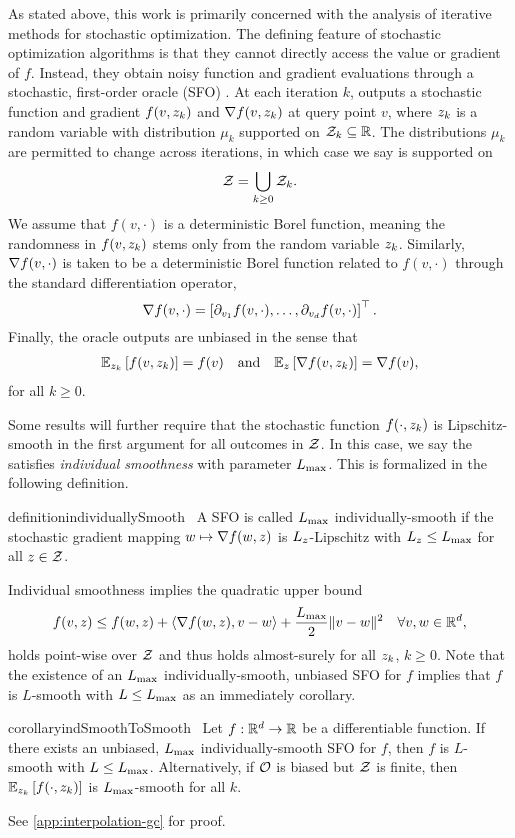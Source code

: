 As stated above, this work is primarily concerned with the analysis of iterative methods for stochastic optimization.
The defining feature of stochastic optimization algorithms is that they cannot directly access the value or gradient of \( f \).
Instead, they obtain noisy function and gradient evaluations through a stochastic, first-order oracle (SFO) \oracle. 
At each iteration \( k \), \oracle{} outputs a stochastic function and gradient \( f(v, \zk) \) and \( \grad(v, \zk) \) at query point \( v \), where \( \zk \) is a random variable with distribution \( \mu_k \) supported on \( \calZ_k \subseteq \R \). 
The distributions \( \mu_k \) are permitted to change across iterations, in which case we say \oracle{} is supported on
\[ \calZ = \bigcup_{k\geq 0} \calZ_k. \]
We assume that \( f(v, \cdot) \) is a deterministic Borel function, meaning the randomness in \( f(v, \zk) \) stems only from the random variable \( \zk \).
Similarly, \( \grad(v, \cdot) \) is taken to be a deterministic Borel function related to \( f(v, \cdot) \) through the standard differentiation operator,
\[ \grad(v, \cdot) = \sbr{\partial_{v_1} f(v, \cdot), \ldots, \partial_{v_d} f(v, \cdot)}^\top. \]
Finally, the oracle outputs are unbiased in the sense that 
\begin{align*}
    \E_{\zk} \sbr{f(v, \zk)} = f(v) \quad \text{and} \quad \E_{\z} \sbr{\grad(v, \zk)} = \grad(v), 
\end{align*}
for all \( k \geq 0 \).

Some results will further require that the stochastic function \( f(\cdot, \zk) \) is Lipschitz-smooth in the first argument for all outcomes in \( \calZ \).
In this case, we say the \oracle{} satisfies \emph{individual smoothness} with parameter \( \Lmax \).
This is formalized in the following definition.
\begin{restatable}{definition}{individuallySmooth}~\label{def:individually-smooth}
    A SFO \oracle{} is called \( \Lmax \) individually-smooth if the stochastic gradient mapping \( \w \mapsto \grad(\w, \z) \) is \( L_{\z} \)-Lipschitz with \( L_{\z} \leq \Lmax \) for all \( \z \in \calZ \).
\end{restatable}
Individual smoothness implies the quadratic upper bound
\[ f(v, \z) \leq f(\w, \z) + \abr{\grad(\w, \z), v - \w} + \frac{\Lmax}{2}\norm{v - \w}^2 \quad \forall v, \w \in \R^d, \]
holds point-wise over \( \calZ \) and thus holds almost-surely for all \( \zk \), \( k \geq 0 \).
Note that the existence of an \( \Lmax \) individually-smooth, unbiased SFO for \( f \) implies that \( f \) is \( L \)-smooth with \( L \leq \Lmax \) as an immediately corollary.
\begin{restatable}{corollary}{indSmoothToSmooth}~\label{cor:ind-smooth-to-smooth}
    Let \( f : \R^d \rightarrow \R \) be a differentiable function.  
    If there exists an unbiased, \( \Lmax \) individually-smooth SFO \oracle{} for \( f \), then \( f \) is \( L \)-smooth with \( L \leq \Lmax \).
    Alternatively, if \( \oracle{} \) is biased but \( \calZ \) is finite, then \( \Ek \sbr{f(\cdot, \zk)} \) is \( \Lmax \)-smooth for all \( k \). 
\end{restatable}
See \autoref{app:interpolation-gc} for proof. \hfill \break

